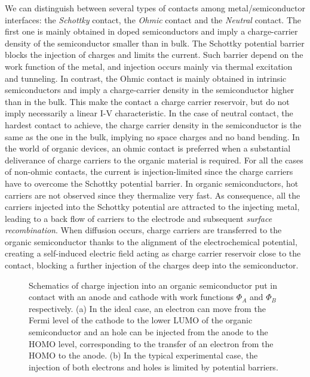 \documentclass  [
  paper    = a4,
  BCOR     = 10mm,
  twoside,
  fontsize = 12pt,
  fleqn,
  toc      = bibnumbered,
  toc      = listofnumbered,
  numbers  = noendperiod,
  headings = normal,
  listof   = leveldown,
  version  = 3.03
]                                       {scrreprt}
\begin{document}
We can distinguish between several types of contacts among metal/semiconductor interfaces: the \emph{Schottky} contact, the \emph{Ohmic} contact and the \emph{Neutral} contact. The first one is mainly obtained in doped semiconductors and imply a charge-carrier density of the semiconductor smaller than in bulk. The Schottky potential barrier blocks the injection of charges and limits the current. Such barrier depend on the work function of the metal, and injection occurs mainly via thermal excitation and tunneling. In contrast, the Ohmic contact is mainly obtained in intrinsic semiconductors and imply a charge-carrier density in the semiconductor higher than in the bulk. This make the contact a charge carrier reservoir, but do not imply necessarily a linear I-V characteristic. In the case of neutral contact, the hardest contact to achieve, the charge carrier density in the semiconductor is the same as the one in the bulk, implying no space charges and no band bending. In the world of organic devices, an ohmic contact is preferred when a substantial deliverance of charge carriers to the organic material is required. For all the cases of non-ohmic contacts, the current is injection-limited since the charge carriers have to overcome the Schottky potential barrier. In organic semiconductors, hot carriers are not observed since they thermalize very fast. As consequence, all the carriers injected into the Schottky potential are attracted to the injecting metal, leading to a back flow of carriers to the electrode and subsequent \emph{surface recombination}. When diffusion occurs, charge carriers are transferred to the organic semiconductor thanks to the alignment of the electrochemical potential, creating a self-induced electric field acting as charge carrier reservoir close to the contact, blocking a further injection of the charges deep into the semiconductor.\\ 
\begin{figure}[t]
	\centering%
	\qquad
	\qquad
	\caption{\footnotesize Schematics of charge injection into an organic semiconductor put in contact with an anode and cathode with work functions $\Phi_A$ and $\Phi_B$ respectively. (a) In the ideal case, an electron can move from the Fermi level of the cathode to the lower LUMO of the organic semiconductor and an hole can be injected from the anode to the HOMO level, corresponding to the transfer of an electron from the HOMO to the anode. (b) In the typical experimental case, the injection of both electrons and holes is limited by potential barriers\cite{book:koehler}.}
	\label{fig:contacts}
\end{figure}
\end{document}
